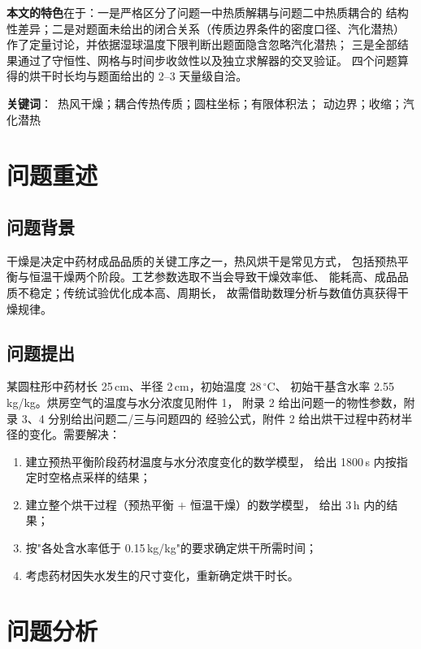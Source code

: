 \documentclass[12pt,a4paper]{ctexart}
\begin{document}
\textbf{本文的特色}在于：一是严格区分了问题一中热质解耦与问题二中热质耦合的
结构性差异；二是对题面未给出的闭合关系（传质边界条件的密度口径、汽化潜热）
作了定量讨论，并依据湿球温度下限判断出题面隐含忽略汽化潜热；
三是全部结果通过了守恒性、网格与时间步收敛性以及独立求解器的交叉验证。
四个问题算得的烘干时长均与题面给出的 2--3 天量级自洽。

\vspace{1em}
\noindent\textbf{关键词}：\ 热风干燥；耦合传热传质；圆柱坐标；有限体积法；
动边界；收缩；汽化潜热

\newpage

\section{问题重述}

\subsection{问题背景}

干燥是决定中药材成品品质的关键工序之一，热风烘干是常见方式，
包括预热平衡与恒温干燥两个阶段。工艺参数选取不当会导致干燥效率低、
能耗高、成品品质不稳定；传统试验优化成本高、周期长，
故需借助数理分析与数值仿真获得干燥规律。

\subsection{问题提出}

某圆柱形中药材长 25\,cm、半径 2\,cm，初始温度 28\,$^\circ$C、
初始干基含水率 2.55\,kg/kg。烘房空气的温度与水分浓度见附件 1，
附录 2 给出问题一的物性参数，附录 3、4 分别给出问题二/三与问题四的
经验公式，附件 2 给出烘干过程中药材半径的变化。需要解决：

\begin{enumerate}
  \item 建立预热平衡阶段药材温度与水分浓度变化的数学模型，
        给出 1800\,s 内按指定时空格点采样的结果；
  \item 建立整个烘干过程（预热平衡 $+$ 恒温干燥）的数学模型，
        给出 3\,h 内的结果；
  \item 按"各处含水率低于 0.15\,kg/kg"的要求确定烘干所需时间；
  \item 考虑药材因失水发生的尺寸变化，重新确定烘干时长。
\end{enumerate}

\section{问题分析}
\end{document}
